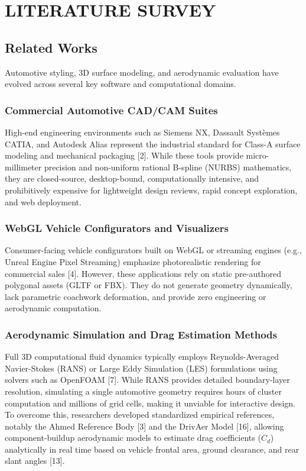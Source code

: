 \documentclass[12pt,a4paper]{report}
\begin{document}
\chapter{LITERATURE SURVEY}

\section{Related Works}
Automotive styling, 3D surface modeling, and aerodynamic evaluation have evolved across several key software and computational domains.

\subsection{Commercial Automotive CAD/CAM Suites}
High-end engineering environments such as Siemens NX, Dassault Systèmes CATIA, and Autodesk Alias represent the industrial standard for Class-A surface modeling and mechanical packaging [2]. While these tools provide micro-millimeter precision and non-uniform rational B-spline (NURBS) mathematics, they are closed-source, desktop-bound, computationally intensive, and prohibitively expensive for lightweight design reviews, rapid concept exploration, and web deployment.

\subsection{WebGL Vehicle Configurators and Visualizers}
Consumer-facing vehicle configurators built on WebGL or streaming engines (e.g., Unreal Engine Pixel Streaming) emphasize photorealistic rendering for commercial sales [4]. However, these applications rely on static pre-authored polygonal assets (GLTF or FBX). They do not generate geometry dynamically, lack parametric coachwork deformation, and provide zero engineering or aerodynamic computation.

\subsection{Aerodynamic Simulation and Drag Estimation Methods}
Full 3D computational fluid dynamics typically employs Reynolds-Averaged Navier-Stokes (RANS) or Large Eddy Simulation (LES) formulations using solvers such as OpenFOAM [7]. While RANS provides detailed boundary-layer resolution, simulating a single automotive geometry requires hours of cluster computation and millions of grid cells, making it unviable for interactive design. To overcome this, researchers developed standardized empirical references, notably the Ahmed Reference Body [3] and the DrivAer Model [16], allowing component-buildup aerodynamic models to estimate drag coefficients ($C_d$) analytically in real time based on vehicle frontal area, ground clearance, and rear slant angles [13].
\end{document}
